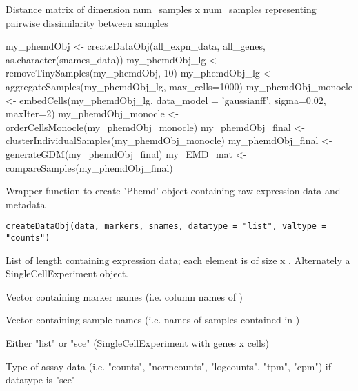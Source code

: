 \documentclass[a4paper]{book}
\begin{document}
%
\begin{Value}
Distance matrix of dimension num\_samples x num\_samples representing pairwise dissimilarity between samples
\end{Value}
%
\begin{Examples}
\begin{ExampleCode}

my_phemdObj <- createDataObj(all_expn_data, all_genes, as.character(snames_data))
my_phemdObj_lg <- removeTinySamples(my_phemdObj, 10)
my_phemdObj_lg <- aggregateSamples(my_phemdObj_lg, max_cells=1000)
my_phemdObj_monocle <- embedCells(my_phemdObj_lg, data_model = 'gaussianff', sigma=0.02, maxIter=2)
my_phemdObj_monocle <- orderCellsMonocle(my_phemdObj_monocle)
my_phemdObj_final <- clusterIndividualSamples(my_phemdObj_monocle)
my_phemdObj_final <- generateGDM(my_phemdObj_final)
my_EMD_mat <- compareSamples(my_phemdObj_final)

\end{ExampleCode}
\end{Examples}
%
\begin{Description}\relax
Wrapper function to create 'Phemd' object containing raw expression data and metadata
\end{Description}
%
\begin{Usage}
\begin{verbatim}
createDataObj(data, markers, snames, datatype = "list", valtype = "counts")
\end{verbatim}
\end{Usage}
%
\begin{Arguments}
\begin{ldescription}
\item[\code{data}] List of length  containing expression data; each element is of size  x . Alternately a SingleCellExperiment object.

\item[\code{markers}] Vector containing marker names (i.e. column names of )

\item[\code{snames}] Vector containing sample names (i.e. names of samples contained in )

\item[\code{datatype}] Either "list" or "sce" (SingleCellExperiment with genes x cells)

\item[\code{valtype}] Type of assay data (i.e. "counts", "normcounts", "logcounts", "tpm", "cpm") if datatype is "sce"
\end{ldescription}
\end{Arguments}
\end{document}
